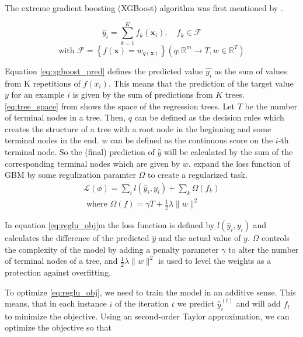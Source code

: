 \documentclass[12pt,a4paper]{article}
\begin{document}
The extreme gradient boosting (XGBoost) algorithm was first mentioned by \textcite{Chen2016}.

\begin{equation}
\hat{y}_{i}=\sum_{k=1}^{K} f_{k}\left(\mathbf{x}_{i}\right), \quad f_{k} \in \mathcal{F}
\label{eq:xgboost_pred}
\end{equation}
\begin{equation*}
\text{with }\mathcal{F}=\left\{f(\mathbf{x})=w_{q(\mathbf{x})}\right\}\left(q: \mathbb{R}^{m} \rightarrow T, w \in \mathbb{R}^{T}\right)
\label{eq:tree_space}
\end{equation*}

Equation \ref{eq:xgboost_pred} defines the predicted value \(\hat{y_i}\) as the sum of values from K repetitions of \(f(x_i)\). This means that the prediction of the target value \(y\) for an example \(i\) is given by the sum of predictions from \(K\) trees. \ref{eq:tree_space} from \textcite{Chen2016} shows the space of the regression trees. Let \(T\) be the number of terminal nodes in a tree. Then, \(q\) can be defined as the decision rules which creates the structure of a tree with a root node in the beginning and some terminal nodes in the end. \(w\) can be defined as the continuous score on the \(i\)-th terminal node. So the (final) prediction of \(\hat{y}\) will be calculated by the sum of the corresponding terminal nodes which are given by \(w\). \textcite{Chen2016} expand the loss function of GBM by some regulization paramter \(\Omega\) to create a regularized task.
\begin{equation}
\begin{array}{l}
\mathcal{L}(\phi)=\sum_{i} l\left(\hat{y}_{i}, y_{i}\right)+\sum_{k} \Omega\left(f_{k}\right) \\
\text { where } \Omega(f)=\gamma T+\frac{1}{2} \lambda\|w\|^{2}
\end{array}
\label{eq:reglu_obj}
\end{equation}

In equation \ref{eq:reglu_obj}m the loss function is defined by \(l\left(\hat{y}_{i}, y_{i}\right)\) and calculates the difference of the predicted \(\hat{y}\) and the actual value of \(y\). \(\Omega\) controls the complexity of the model by adding a penalty parameter \(\gamma\) to alter the number of terminal nodes of a tree, and \(\frac{1}{2} \lambda\|w\|^{2}\) is used to level the weights as a protection against overfitting.

To optimize \ref{eq:reglu_obj}, we need to train the model in an additive sense. This means, that in each instance \(i\) of the iteration \(t\) we predict \(\hat{y}_i^{(t)}\) and will add \(f_t\) to minimize the objective. Using an second-order Taylor approximation, we can optimize the objective so that
\end{document}
